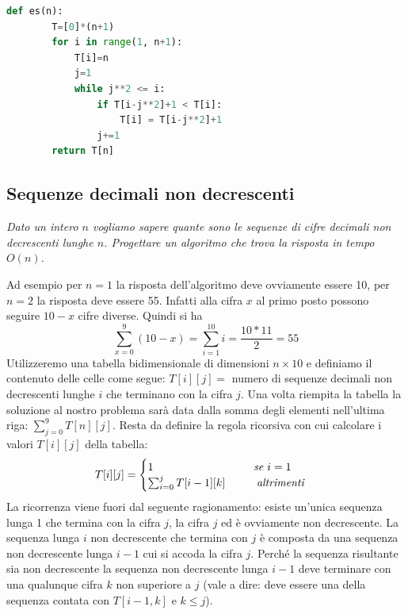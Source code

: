 \begin{lstlisting}[language=Python]
    def es(n):
        T=[0]*(n+1)
        for i in range(1, n+1):
            T[i]=n
            j=1
            while j**2 <= i:
                if T[i-j**2]+1 < T[i]:
                    T[i] = T[i-j**2]+1
                j+=1
        return T[n]
\end{lstlisting}

\subsection{Sequenze decimali non decrescenti}
\textit{Dato un intero $n$ vogliamo sapere quante sono le sequenze di cifre decimali non decrescenti lunghe $n$. Progettare un algoritmo che trova la risposta in tempo $O(n)$.}

Ad esempio per $n=1$ la risposta dell'algoritmo deve ovviamente essere 10, per $n=2$ la risposta deve essere 55. Infatti alla cifra $x$ al primo posto possono seguire $10-x$ cifre diverse. Quindi si ha
\begin{equation*}
    \sum^9_{x=0}(10-x)=\sum^{10}_{i=1}i=\frac{10*11}{2}=55
\end{equation*}
Utilizzeremo una tabella bidimensionale di dimensioni $n\times 10$ e definiamo il contenuto delle celle come segue: $T[i][j] =$ numero di sequenze decimali non decrescenti lunghe $i$ che terminano con la cifra $j$. Una volta riempita la tabella la soluzione al nostro problema sarà data dalla somma degli elementi nell'ultima riga: $\sum^9_{j=0}T[n][j]$.
Resta da definire la regola ricorsiva con cui calcolare i valori $T[i][j]$ della tabella:
\begin{equation*}T[i][j]=
    \begin{cases}
        1\hspace{3.2cm}\textit{se }i=1\\
        \sum^j_{i=0}T[i-1][k]\hspace{1cm}\textit{altrimenti}
    \end{cases}
\end{equation*}
La ricorrenza viene fuori dal seguente ragionamento: esiste un'unica sequenza lunga 1 che termina con la cifra $j$, la cifra $j$ ed è ovviamente non decrescente. La sequenza lunga $i$ non decrescente che termina con $j$ è composta da una sequenza non decrescente lunga $i-1$ cui si accoda la cifra $j$. Perché la sequenza risultante sia non decrescente la sequenza non decrescente lunga $i-1$ deve terminare con una qualunque cifra $k$ non superiore a $j$ (vale a dire: deve essere una della sequenza contata con $T[i-1, k]$ e $k\leq j$).

